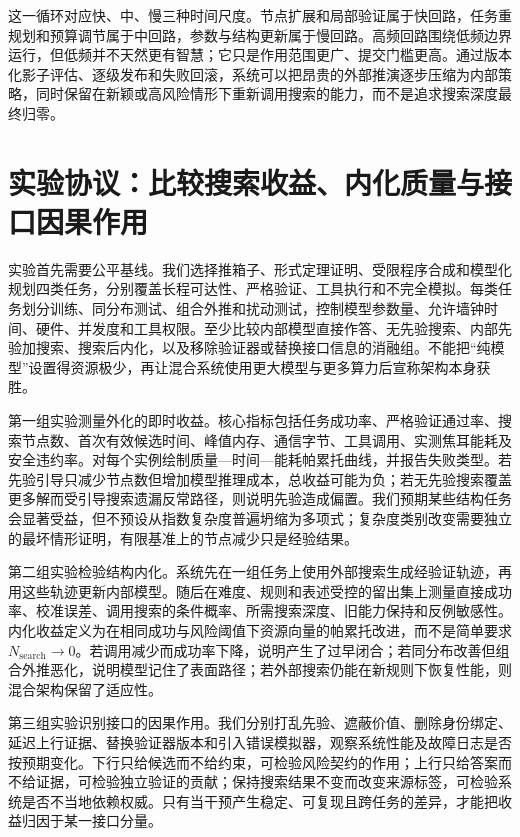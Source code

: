 这一循环对应快、中、慢三种时间尺度。节点扩展和局部验证属于快回路，任务重规划和预算调节属于中回路，参数与结构更新属于慢回路。高频回路围绕低频边界运行，但低频并不天然更有智慧；它只是作用范围更广、提交门槛更高。通过版本化影子评估、逐级发布和失败回滚，系统可以把昂贵的外部推演逐步压缩为内部策略，同时保留在新颖或高风险情形下重新调用搜索的能力，而不是追求搜索深度最终归零。

\section{实验协议：比较搜索收益、内化质量与接口因果作用}
\label{sec:alpha_hsf_experimental_verification}

实验首先需要公平基线。我们选择推箱子、形式定理证明、受限程序合成和模型化规划四类任务，分别覆盖长程可达性、严格验证、工具执行和不完全模拟。每类任务划分训练、同分布测试、组合外推和扰动测试，控制模型参数量、允许墙钟时间、硬件、并发度和工具权限。至少比较内部模型直接作答、无先验搜索、内部先验加搜索、搜索后内化，以及移除验证器或替换接口信息的消融组。不能把“纯模型”设置得资源极少，再让混合系统使用更大模型与更多算力后宣称架构本身获胜。

第一组实验测量外化的即时收益。核心指标包括任务成功率、严格验证通过率、搜索节点数、首次有效候选时间、峰值内存、通信字节、工具调用、实测焦耳能耗及安全违约率。对每个实例绘制质量—时间—能耗帕累托曲线，并报告失败类型。若先验引导只减少节点数但增加模型推理成本，总收益可能为负；若无先验搜索覆盖更多解而受引导搜索遗漏反常路径，则说明先验造成偏置。我们预期某些结构任务会显著受益，但不预设从指数复杂度普遍坍缩为多项式；复杂度类别改变需要独立的最坏情形证明，有限基准上的节点减少只是经验结果。

第二组实验检验结构内化。系统先在一组任务上使用外部搜索生成经验证轨迹，再用这些轨迹更新内部模型。随后在难度、规则和表述受控的留出集上测量直接成功率、校准误差、调用搜索的条件概率、所需搜索深度、旧能力保持和反例敏感性。内化收益定义为在相同成功与风险阈值下资源向量的帕累托改进，而不是简单要求 $N_{\mathrm{search}}\to0$。若调用减少而成功率下降，说明产生了过早闭合；若同分布改善但组合外推恶化，说明模型记住了表面路径；若外部搜索仍能在新规则下恢复性能，则混合架构保留了适应性。

第三组实验识别接口的因果作用。我们分别打乱先验、遮蔽价值、删除身份绑定、延迟上行证据、替换验证器版本和引入错误模拟器，观察系统性能及故障日志是否按预期变化。下行只给候选而不给约束，可检验风险契约的作用；上行只给答案而不给证据，可检验独立验证的贡献；保持搜索结果不变而改变来源标签，可检验系统是否不当地依赖权威。只有当干预产生稳定、可复现且跨任务的差异，才能把收益归因于某一接口分量。

